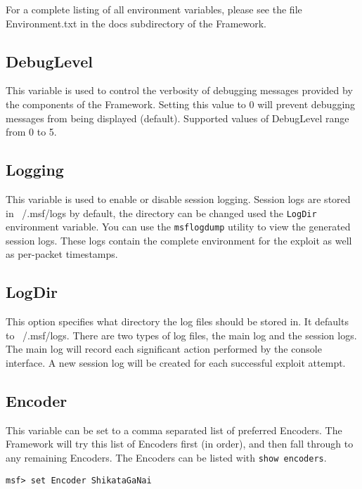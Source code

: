 \documentclass{report}
\begin{document}
\par
For a complete listing of all environment variables, please see the file
Environment.txt in the docs subdirectory of the Framework. 


	\subsection{DebugLevel}
\par
This variable is used to control the verbosity of debugging messages provided by
the components of the Framework. Setting this value to 0 will prevent debugging
messages from being displayed (default). Supported values of DebugLevel range from 0 to 5. 

	\subsection{Logging}
\par
This variable is used to enable or disable session logging. Session logs are
stored in ~/.msf/logs by default, the directory can be changed used the
\texttt{LogDir} environment variable. You can use the \texttt{msflogdump}
utility to view the generated session logs. These logs contain the complete
environment for the exploit as well as per-packet timestamps.  

	\subsection{LogDir}
\par
This option specifies what directory the log files should be stored in. It
defaults to ~/.msf/logs. There are two types of log files, the main log and the
session logs. The main log will record each significant action performed by the
console interface. A new session log will be created for each successful exploit
attempt.  

	\subsection{Encoder}
\par
This variable can be set to a comma separated list of preferred Encoders. The
Framework will try this list of Encoders first (in order), and then fall through
to any remaining Encoders. The Encoders can be listed with \texttt{show encoders}.  

\begin{verbatim}
msf> set Encoder ShikataGaNai
\end{verbatim}
\end{document}
